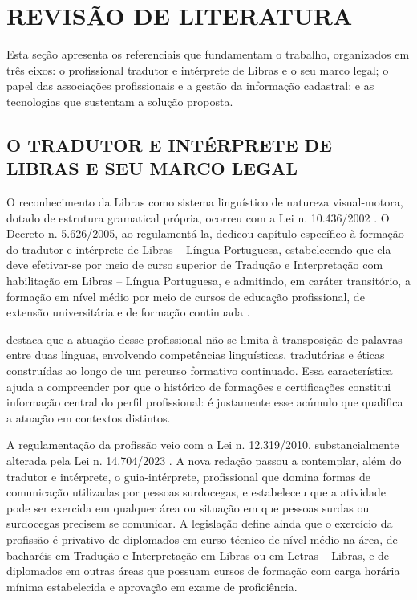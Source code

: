 \documentclass[
        oneside,      %
        english,			
        brazil			 
        ]{abntspiifac}
\begin{document}
\chapter{REVISÃO DE LITERATURA}

Esta seção apresenta os referenciais que fundamentam o trabalho, organizados em três eixos: o profissional tradutor e intérprete de Libras e o seu marco legal; o papel das associações profissionais e a gestão da informação cadastral; e as tecnologias que sustentam a solução proposta.

\section{O TRADUTOR E INTÉRPRETE DE LIBRAS E SEU MARCO LEGAL}

O reconhecimento da Libras como sistema linguístico de natureza visual-motora, dotado de estrutura gramatical própria, ocorreu com a Lei n. 10.436/2002 \citep{brasil2002lei10436}. O Decreto n. 5.626/2005, ao regulamentá-la, dedicou capítulo específico à formação do tradutor e intérprete de Libras -- Língua Portuguesa, estabelecendo que ela deve efetivar-se por meio de curso superior de Tradução e Interpretação com habilitação em Libras -- Língua Portuguesa, e admitindo, em caráter transitório, a formação em nível médio por meio de cursos de educação profissional, de extensão universitária e de formação continuada \citep{brasil2005decreto5626}.

\citet{quadros2004tradutor} destaca que a atuação desse profissional não se limita à transposição de palavras entre duas línguas, envolvendo competências linguísticas, tradutórias e éticas construídas ao longo de um percurso formativo continuado. Essa característica ajuda a compreender por que o histórico de formações e certificações constitui informação central do perfil profissional: é justamente esse acúmulo que qualifica a atuação em contextos distintos.

A regulamentação da profissão veio com a Lei n. 12.319/2010, substancialmente alterada pela Lei n. 14.704/2023 \citep{brasil2010lei12319,brasil2023lei14704}. A nova redação passou a contemplar, além do tradutor e intérprete, o guia-intérprete, profissional que domina formas de comunicação utilizadas por pessoas surdocegas, e estabeleceu que a atividade pode ser exercida em qualquer área ou situação em que pessoas surdas ou surdocegas precisem se comunicar. A legislação define ainda que o exercício da profissão é privativo de diplomados em curso técnico de nível médio na área, de bacharéis em Tradução e Interpretação em Libras ou em Letras -- Libras, e de diplomados em outras áreas que possuam cursos de formação com carga horária mínima estabelecida e aprovação em exame de proficiência.
\end{document}
